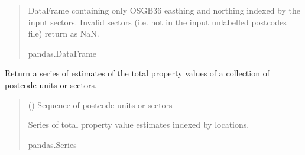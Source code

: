 \documentclass[letterpaper,10pt,english]{sphinxmanual}
\begin{document}
\begin{fulllineitems}
\begin{fulllineitems}
\begin{quote}
\begin{description}
\sphinxAtStartPar
DataFrame containing only OSGB36 easthing and northing indexed
by the input sectors. Invalid sectors (i.e. not in the
input unlabelled postcodes file) return as NaN.

\sphinxAtStartPar
pandas.DataFrame

\end{description}\end{quote}

\end{fulllineitems}


\begin{fulllineitems}
\label{\detokenize{index:flood_tool.Tool.get_total_value}}
\pysigstartsignatures
{}
\pysigstopsignatures
\sphinxAtStartPar
Return a series of estimates of the total property values
of a collection of postcode units or sectors.
\begin{quote}\begin{description}
\sphinxAtStartPar
{} () \textendash{} Sequence of postcode units or sectors

\sphinxAtStartPar
Series of total property value estimates indexed by locations.

\sphinxAtStartPar
pandas.Series

\end{description}\end{quote}

\end{fulllineitems}


\end{fulllineitems}

\end{document}
